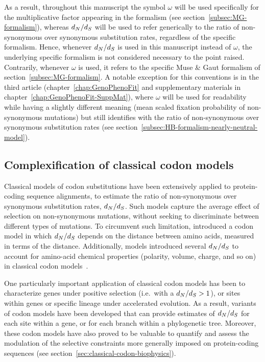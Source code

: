 As a result, throughout this manuscript the symbol $\omega$ will be used specifically for the multiplicative factor appearing in the \citet{Muse1994} formalism (see section~\ref{subsec:MG-formalism}), whereas $d_N / d_S$ will be used to refer generically to the ratio of \gls{non-synonymous} over \gls{synonymous} \gls{substitution} rates, regardless of the specific formalism.
Hence, whenever $d_N / d_S$ is used in this manuscript instead of $\omega$, the underlying specific formalism is not considered necessary to the point raised.
Contrarily, whenever $\omega$ is used, it refers to the specific Muse \& Gaut formalism of section~\ref{subsec:MG-formalism}.
A notable exception for this conventions is in the third article (chapter~\ref{chap:GenoPhenoFit} and supplementary materials in chapter~\ref{chap:GenoPhenoFit-SuppMat}), where $\omega$ will be used for readability while having a slightly different meaning (mean scaled fixation probability of \gls{non-synonymous} mutations) but still identifies with the ratio of \gls{non-synonymous} over \gls{synonymous} \gls{substitution} rates (see section~\ref{subsec:HB-formalism-nearly-neutral-model}).

\subsection{Complexification of classical codon models}
\label{subsec:classical-codon-models-complexification}

Classical models of \gls{codon} \glspl{substitution} have been extensively applied to protein-coding sequence alignments, to estimate the ratio of \gls{non-synonymous} over \gls{synonymous} \gls{substitution} rates, $d_N / d_S$.
Such models capture the average effect of selection on \gls{non-synonymous} mutations, without seeking to discriminate between different types of mutations.
To circumvent such limitation, \citet{Yang1998a} introduced a \gls{codon} model in which $d_N / d_S$ depends on the distance between amino acids, measured in terms of the \citet{Grantham1974} distance.
Additionally, models introduced several $d_N / d_S$ to account for amino-acid chemical properties (polarity, volume, charge, and so on) in classical \gls{codon} models~\citep{Dutheil2008}.

One particularly important application of classical \gls{codon} models has been to characterize genes under positive selection (i.e.~with a $d_N / d_S > 1$), or sites within genes or specific lineage under accelerated evolution.
As a result, variants of \gls{codon} models have been developed that can provide estimates of $d_N / d_S$ for each site within a gene, or for each branch within a phylogenetic tree.
Moreover, these \gls{codon} models have also proved to be valuable to quantify and assess the modulation of the selective constraints more generally imposed on protein-coding sequences (see section~\ref{sec:classical-codon-biophysics}).


